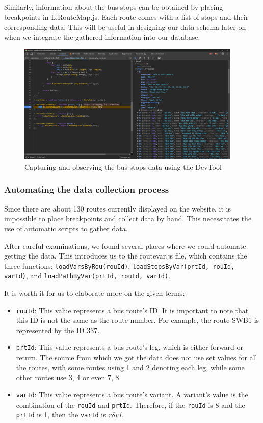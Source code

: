 Similarly, information about the bus stops can be obtained by placing breakpoints in L.RouteMap.js. Each route comes with a list of stops and their corresponding data. This will be useful in designing our data schema later on when we integrate the gathered information into our database.

\begin{figure}[H]
    \centering
    \includegraphics[width=0.95\textwidth]{assets/images/Research/Bus/stop_web.png}
    \caption{Capturing and observing the bus stops data using the DevTool}
    \label{fig:stop_data}
\end{figure}

\subsubsection{Automating the data collection process}

Since there are about 130 routes currently displayed on the website, it is impossible to place breakpoints and collect data by hand. This necessitates the use of automatic scripts to gather data.

After careful examinations, we found several places where we could automate getting the data. This introduces us to the routevar.js file, which contains the three functions: \lstinline{loadVarsByRou(rouId)}, \lstinline{loadStopsByVar(prtId, rouId, varId)}, and \lstinline{loadPathByVar(prtId, rouId, varId)}.

It is worth it for us to elaborate more on the given terms:
\begin{itemize}
    \item \lstinline{rouId}: This value represents a bus route's ID. It is important to note that this ID is not the same as the route number. For example, the route SWB1 is represented by the ID 337. 
    \item \lstinline{prtId}: This value represents a bus route's leg, which is either forward or return. The source from which we got the data does not use set values for all the routes, with some routes using 1 and 2 denoting each leg, while some other routes use 3, 4 or even 7, 8. 
    \item \lstinline{varId}: This value represents a bus route's variant. A variant's value is the combination of the \lstinline{rouId} and \lstinline{prtId}. Therefore, if the \lstinline{rouId} is 8 and the \lstinline{prtId} is 1, then the \lstinline{varId} is \textit{r8v1}.
\end{itemize}

